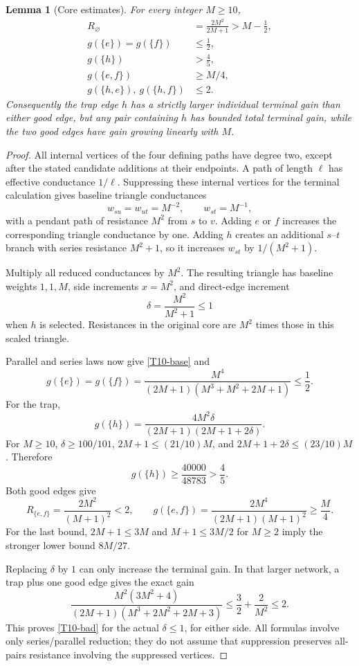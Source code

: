 \documentclass[11pt,a4paper]{article}
\newtheorem{lemma}[theorem]{Lemma}
\theoremstyle{definition}\newtheorem{definition}[theorem]{Definition}
\theoremstyle{remark}\newtheorem{remark}[theorem]{Remark}
\numberwithin{equation}{section}
\begin{document}
\begin{lemma}[Core estimates]\label{T10-core}
For every integer $M\ge10$,
\begin{align}
 R_\varnothing&=\frac{2M^2}{2M+1}>M-\tfrac12,\label{T10-base}\\
 g(\{e\})=g(\{f\})&\le\tfrac12,\label{T10-single}\\
 g(\{h\})&>\tfrac45,\label{T10-trap}\\
 g(\{e,f\})&\ge M/4,\label{T10-good}\\
 g(\{h,e\}),\ g(\{h,f\})&\le2.\label{T10-bad}
\end{align}
Consequently the trap edge $h$ has a strictly larger individual terminal gain than either good edge, but any pair containing $h$ has bounded total terminal gain, while the two good edges have gain growing linearly with $M$.
\end{lemma}
\begin{proof}
All internal vertices of the four defining paths have degree two, except after the stated candidate additions at their endpoints. A path of length $\ell$ has effective conductance $1/\ell$. Suppressing these internal vertices for the terminal calculation gives baseline triangle conductances
\[
 w_{su}=w_{ut}=M^{-2},\qquad w_{st}=M^{-1},
\]
with a pendant path of resistance $M^2$ from $s$ to $v$. Adding $e$ or $f$ increases the corresponding triangle conductance by one. Adding $h$ creates an additional $s$--$t$ branch with series resistance $M^2+1$, so it increases $w_{st}$ by $1/(M^2+1)$.

Multiply all reduced conductances by $M^2$. The resulting triangle has baseline weights $1,1,M$, side increments $x=M^2$, and direct-edge increment
\[
 \delta=\frac{M^2}{M^2+1}\le1
\]
when $h$ is selected. Resistances in the original core are $M^2$ times those in this scaled triangle.

Parallel and series laws now give \eqref{T10-base} and
\[
 g(\{e\})=g(\{f\})
 =\frac{M^4}{(2M+1)(M^3+M^2+2M+1)}\le\frac12.
\]
For the trap,
\[
 g(\{h\})=\frac{4M^2\delta}{(2M+1)(2M+1+2\delta)}.
\]
For $M\ge10$, $\delta\ge100/101$, $2M+1\le(21/10)M$, and $2M+1+2\delta\le(23/10)M$. Therefore
\[
 g(\{h\})\ge\frac{40000}{48783}>\frac45.
\]
Both good edges give
\[
 R_{\{e,f\}}=\frac{2M^2}{(M+1)^2}<2,\qquad
 g(\{e,f\})=\frac{2M^4}{(2M+1)(M+1)^2}\ge\frac M4.
\]
For the last bound, $2M+1\le3M$ and $M+1\le3M/2$ for $M\ge2$ imply the stronger lower bound $8M/27$.

Replacing $\delta$ by $1$ can only increase the terminal gain. In that larger network, a trap plus one good edge gives the exact gain
\[
 \frac{M^2(3M^2+4)}{(2M+1)(M^3+2M^2+2M+3)}
 \le\frac32+\frac2{M^2}\le2.
\]
This proves \eqref{T10-bad} for the actual $\delta\le1$, for either side. All formulas involve only series/parallel reduction; they do not assume that suppression preserves all-pairs resistance involving the suppressed vertices.
\end{proof}
\end{document}
